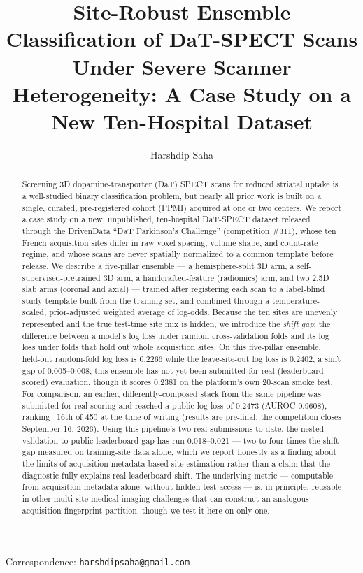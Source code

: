 \documentclass[11pt]{article}
\title{\textbf{Site-Robust Ensemble Classification of DaT-SPECT Scans Under Severe Scanner Heterogeneity: A Case Study on a New Ten-Hospital Dataset}}
\author[1]{Harshdip Saha}
\affil[1]{Independent Researcher}
\date{}
\begin{document}
\maketitle

\begin{center}
\small
Correspondence: \texttt{harshdipsaha@gmail.com}
\end{center}

\begin{abstract}
\noindent
Screening 3D dopamine-transporter (DaT) SPECT scans for reduced striatal uptake is a well-studied binary classification problem, but nearly all prior work is built on a single, curated, pre-registered cohort (PPMI) acquired at one or two centers. We report a case study on a new, unpublished, ten-hospital DaT-SPECT dataset released through the DrivenData ``DaT Parkinson's Challenge'' (competition \#311), whose ten French acquisition sites differ in raw voxel spacing, volume shape, and count-rate regime, and whose scans are never spatially normalized to a common template before release. We describe a five-pillar ensemble --- a hemisphere-split 3D arm, a self-supervised-pretrained 3D arm, a handcrafted-feature (radiomics) arm, and two 2.5D slab arms (coronal and axial) --- trained after registering each scan to a label-blind study template built from the training set, and combined through a temperature-scaled, prior-adjusted weighted average of log-odds. Because the ten sites are unevenly represented and the true test-time site mix is hidden, we introduce the \emph{shift gap}: the difference between a model's log loss under random cross-validation folds and its log loss under folds that hold out whole acquisition sites. On this five-pillar ensemble, held-out random-fold log loss is 0.2266 while the leave-site-out log loss is 0.2402, a shift gap of 0.005--0.008; this ensemble has not yet been submitted for real (leaderboard-scored) evaluation, though it scores 0.2381 on the platform's own 20-scan smoke test. For comparison, an earlier, differently-composed stack from the same pipeline was submitted for real scoring and reached a public log loss of 0.2473 (AUROC 0.9608), ranking ~16th of 450 at the time of writing (results are pre-final; the competition closes September 16, 2026). Using this pipeline's two real submissions to date, the nested-validation-to-public-leaderboard gap has run 0.018--0.021 --- two to four times the shift gap measured on training-site data alone, which we report honestly as a finding about the limits of acquisition-metadata-based site estimation rather than a claim that the diagnostic fully explains real leaderboard shift. The underlying metric --- computable from acquisition metadata alone, without hidden-test access --- is, in principle, reusable in other multi-site medical imaging challenges that can construct an analogous acquisition-fingerprint partition, though we test it here on only one.
\end{abstract}
\end{document}

